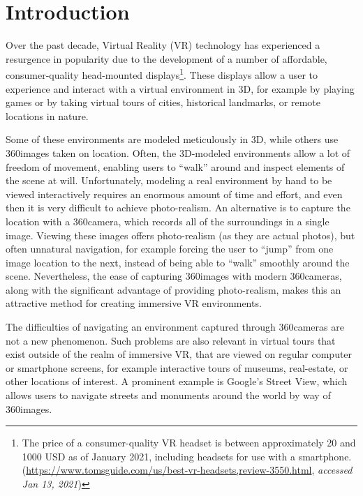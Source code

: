 \chapter{Introduction}

Over the past decade, Virtual Reality (VR) technology has experienced a resurgence in popularity due to the development of a number of affordable, consumer-quality head-mounted displays\footnote{The price of a consumer-quality VR headset is between approximately 20 and 1000 USD as of January 2021, including headsets for use with a smartphone. \\(\url{https://www.tomsguide.com/us/best-vr-headsets,review-3550.html}, \emph{accessed Jan 13, 2021})}. These displays allow a user to experience and interact with a virtual environment in 3D, for example by playing games or by taking virtual tours of cities, historical landmarks, or remote locations in nature.

Some of these environments are modeled meticulously in 3D, while others use 360\degree images taken on location. Often, the 3D-modeled environments allow a lot of freedom of movement, enabling users to ``walk'' around and inspect elements of the scene at will. Unfortunately, modeling a real environment by hand to be viewed interactively requires an enormous amount of time and effort, and even then it is very difficult to achieve photo-realism. An alternative is to capture the location with a 360\degree camera, which records all of the surroundings in a single image. Viewing these images offers photo-realism (as they are actual photos), but often unnatural navigation, for example forcing the user to ``jump'' from one image location to the next, instead of being able to ``walk'' smoothly around the scene. Nevertheless, the ease of capturing 360\degree images with modern 360\degree cameras, along with the significant advantage of providing photo-realism, makes this an attractive method for creating immersive VR environments.

The difficulties of navigating an environment captured through 360\degree cameras are not a new phenomenon. Such problems are also relevant in virtual tours that exist outside of the realm of immersive VR, that are viewed on regular computer or smartphone screens, for example interactive tours of museums, real-estate, or other locations of interest. A prominent example is Google's Street View, which allows users to navigate streets and monuments around the world by way of 360\degree images.

